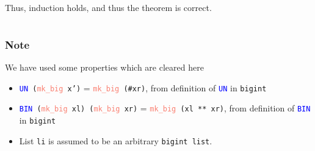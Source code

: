 \documentclass{article}
\begin{document}
{\large Thus, induction holds, and thus the theorem is correct.}

\subsubsection*{}
\subsubsection*{}
\section*{}
\subsubsection*{Note}
We have used some properties which are cleared here
\begin{itemize}
    \item \texttt{\textcolor{blue}{UN} (\textcolor{Salmon}{mk\_big} x')} = \texttt{\textcolor{Salmon}{mk\_big} (\#xr)}, from definition of \texttt{\textcolor{blue}{UN}} in \texttt{bigint}
    \item \texttt{\textcolor{blue}{BIN} (\textcolor{Salmon}{mk\_big} xl) (\textcolor{Salmon}{mk\_big} xr)} = \texttt{\textcolor{Salmon}{mk\_big} (xl ** xr)},  from definition of \texttt{\textcolor{blue}{BIN}} in \texttt{bigint}
    \item List \texttt{li} is assumed to be an arbitrary \texttt{bigint list}.
\end{itemize}



\end{document}
